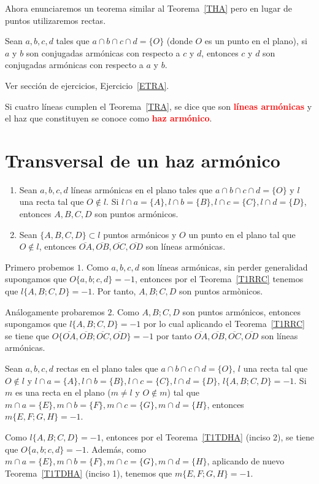 Ahora enunciaremos un teorema similar al Teorema~\ref{THA} pero en lugar de puntos utilizaremos rectas.

\begin{teo}\label{TRA}
Sean $a,b,c,d$ tales que $a\cap b\cap c\cap d=\{O\}$ (donde $O$ es un punto en el plano), si $a$ y $b$ son conjugadas armónicas con respecto a $c$ y $d$, entonces $c$ y $d$ son conjugadas armónicas con respecto a $a$ y $b$. 
\end{teo}
\begin{dem}
Ver sección de ejercicios, Ejercicio~\ref{ETRA}.
\end{dem}
Si cuatro líneas cumplen el Teorema~\ref{TRA}, se dice que son \textcolor{red}{\bf líneas armónicas} y el haz que constituyen se conoce como \textcolor{red}{\bf haz armónico}.
\section{Transversal de un haz armónico}
\begin{teo}\label{T1TDHA}
\begin{enumerate}

\item Sean $a,b,c,d$ líneas armónicas en el plano tales que $a\cap b\cap c\cap d=\{O\}$  y $l$ una recta tal que $O\notin l$. Si $l\cap a=\{A\}, l\cap b=\{B\}, l\cap c=\{C\}, l\cap d=\{D\}$, entonces $A,B,C,D$ son puntos armónicos. 
\item Sean $\{A,B,C,D\}\subset l$ puntos armónicos y $O$ un punto en el plano tal que $O\notin l$, entonces $\overline{OA}, \overline{OB}, \overline{OC}, \overline{OD}$ son líneas armónicas.
\end{enumerate}
\end{teo}
\begin{dem}
Primero probemos $1$. Como $a,b,c,d$ son líneas armónicas, sin perder generalidad supongamos que $O\{a,b;c,d\}=-1$, entonces por el Teorema~\ref{T1RRC} tenemos que $l\{A,B;C,D\}=-1$. Por tanto, $A,B;C,D$ son puntos armònicos.

Análogamente probaremos $2$. Como $A,B;C,D$ son puntos armónicos, entonces supongamos que $l\{A,B;C,D\}=-1$ por lo cual aplicando el Teorema~\ref{T1RRC} se tiene que $O\{\overline{OA}, \overline{OB}; \overline{OC}, \overline{OD}\}=-1$ por tanto $\overline{OA}, \overline{OB}, \overline{OC}, \overline{OD}$ son líneas armónicas.
\end{dem}

\begin{cor}
Sean $a,b,c,d$ rectas en el plano tales que $a\cap b\cap c\cap d=\{O\}$, $l$ una recta tal que $O\notin l$ y $l\cap a=\{A\}, l\cap b=\{B\}, l\cap c=\{C\}, l\cap d=\{D\}$, $l\{A,B;C,D\}=-1$. Si $m$ es una recta en el plano ($m\neq l$ y $O\notin m$) tal que $m\cap a=\{E\}, m\cap b=\{F\}, m\cap c=\{G\}, m\cap d=\{H\}$, entonces $m\{E,F;G,H\}=-1$. 
\end{cor}
\begin{pba}\label{CTDHA}
Como $l\{A,B;C,D\}=-1$, entonces por el Teorema~\ref{T1TDHA} (inciso 2), se tiene que $O\{a,b;c,d\}=-1$. Además, como $m\cap a=\{E\}, m\cap b=\{F\}, m\cap c=\{G\}, m\cap d=\{H\}$, aplicando de nuevo Teorema~\ref{T1TDHA} (inciso 1), tenemos que $m\{E,F;G,H\}=-1$.
\end{pba}
